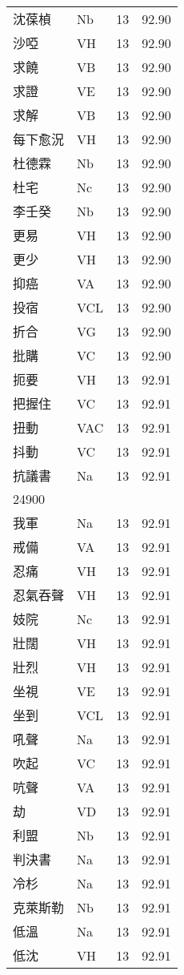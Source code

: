 \documentclass[twocolumn]{book}
\begin{document}
\begin{supertabular}{llrr}
沈葆楨 & Nb & 13 &  92.90\\
沙啞 & VH & 13 &  92.90\\
求饒 & VB & 13 &  92.90\\
求證 & VE & 13 &  92.90\\
求解 & VB & 13 &  92.90\\
每下愈況 & VH & 13 &  92.90\\
杜德霖 & Nb & 13 &  92.90\\
杜宅 & Nc & 13 &  92.90\\
李壬癸 & Nb & 13 &  92.90\\
更易 & VH & 13 &  92.90\\
更少 & VH & 13 &  92.90\\
抑癌 & VA & 13 &  92.90\\
投宿 & VCL & 13 &  92.90\\
折合 & VG & 13 &  92.90\\
批購 & VC & 13 &  92.90\\
扼要 & VH & 13 &  92.91\\
把握住 & VC & 13 &  92.91\\
扭動 & VAC & 13 &  92.91\\
抖動 & VC & 13 &  92.91\\
抗議書 & Na & 13 &  92.91\\
24900\\
我軍 & Na & 13 &  92.91\\
戒備 & VA & 13 &  92.91\\
忍痛 & VH & 13 &  92.91\\
忍氣吞聲 & VH & 13 &  92.91\\
妓院 & Nc & 13 &  92.91\\
壯闊 & VH & 13 &  92.91\\
壯烈 & VH & 13 &  92.91\\
坐視 & VE & 13 &  92.91\\
坐到 & VCL & 13 &  92.91\\
吼聲 & Na & 13 &  92.91\\
吹起 & VC & 13 &  92.91\\
吭聲 & VA & 13 &  92.91\\
劫 & VD & 13 &  92.91\\
利盟 & Nb & 13 &  92.91\\
判決書 & Na & 13 &  92.91\\
冷杉 & Na & 13 &  92.91\\
克萊斯勒 & Nb & 13 &  92.91\\
低溫 & Na & 13 &  92.91\\
低沈 & VH & 13 &  92.91\\

\end{supertabular}
\end{document}
